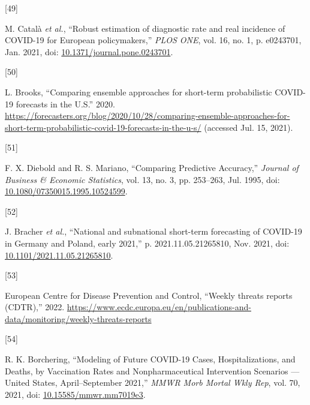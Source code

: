 \documentclass[
]{article}
\newlength{\cslhangindent}
\newlength{\csllabelwidth}
\newlength{\cslentryspacingunit} %
\newenvironment{CSLReferences}[2] %
 {%
  \setlength{\parindent}{0pt}
  \ifodd #1
  \let\oldpar\par
  \def\par{\hangindent=\cslhangindent\oldpar}
  \fi
  \setlength{\parskip}{#2\cslentryspacingunit}
 }%
 {}
\newcommand{\CSLLeftMargin}[1]{\parbox[t]{\csllabelwidth}{#1}}
\newcommand{\CSLRightInline}[1]{\parbox[t]{\linewidth - \csllabelwidth}{#1}\break}
\begin{document}
\begin{CSLReferences}{0}{0}
\leavevmode{}%
\CSLLeftMargin{{[}49{]} }
\CSLRightInline{M. Català \emph{et al.}, {``Robust estimation of diagnostic rate and real incidence of {COVID-19} for {European} policymakers,''} \emph{PLOS ONE}, vol. 16, no. 1, p. e0243701, Jan. 2021, doi: \href{https://doi.org/10.1371/journal.pone.0243701}{10.1371/journal.pone.0243701}.}

\leavevmode{}%
\CSLLeftMargin{{[}50{]} }
\CSLRightInline{L. Brooks, {``Comparing ensemble approaches for short-term probabilistic {COVID-19} forecasts in the {U}.{S}.''} 2020. \url{https://forecasters.org/blog/2020/10/28/comparing-ensemble-approaches-for-short-term-probabilistic-covid-19-forecasts-in-the-u-s/} (accessed Jul. 15, 2021).}

\leavevmode{}%
\CSLLeftMargin{{[}51{]} }
\CSLRightInline{F. X. Diebold and R. S. Mariano, {``Comparing {Predictive Accuracy},''} \emph{Journal of Business \& Economic Statistics}, vol. 13, no. 3, pp. 253--263, Jul. 1995, doi: \href{https://doi.org/10.1080/07350015.1995.10524599}{10.1080/07350015.1995.10524599}.}

\leavevmode{}%
\CSLLeftMargin{{[}52{]} }
\CSLRightInline{J. Bracher \emph{et al.}, {``National and subnational short-term forecasting of {COVID-19} in {Germany} and {Poland}, early 2021,''} p. 2021.11.05.21265810, Nov. 2021, doi: \href{https://doi.org/10.1101/2021.11.05.21265810}{10.1101/2021.11.05.21265810}.}

\leavevmode{}%
\CSLLeftMargin{{[}53{]} }
\CSLRightInline{European Centre for Disease Prevention and Control, {``Weekly threats reports ({CDTR}),''} 2022. \url{https://www.ecdc.europa.eu/en/publications-and-data/monitoring/weekly-threats-reports}}

\leavevmode{}%
\CSLLeftMargin{{[}54{]} }
\CSLRightInline{R. K. Borchering, {``Modeling of {Future COVID-19 Cases}, {Hospitalizations}, and {Deaths}, by {Vaccination Rates} and {Nonpharmaceutical Intervention Scenarios} --- {United States}, {April}--{September} 2021,''} \emph{MMWR Morb Mortal Wkly Rep}, vol. 70, 2021, doi: \href{https://doi.org/10.15585/mmwr.mm7019e3}{10.15585/mmwr.mm7019e3}.}

\end{CSLReferences}

\newpage
\end{document}
